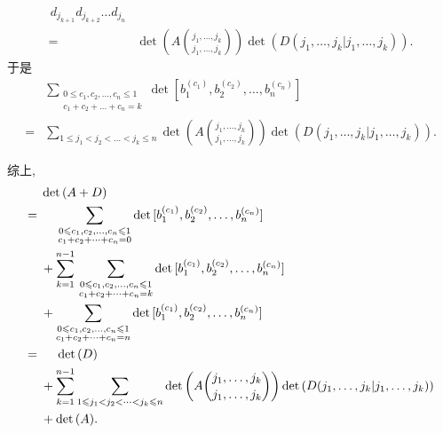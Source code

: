 \begin{example}
\begin{align*}
        \,
        d_{j_{k+1}} d_{j_{k+2}} \dots d_{j_n}
        \\
        = {} &
        \det {\left(
            A\binom{j_1,\dots,j_k}{j_1,\dots,j_k}
            \right)}
        \det {(D({j_1,\dots,j_k}|{j_1,\dots,j_k}))}.
    \end{align*}
    于是
    \begin{align*}
             &
        \sum_{\substack{0 \leq c_1, c_2, \dots, c_n \leq 1 \\
                c_1 + c_2 + \dots + c_n = k}}
        \det {[b_1^{(c_1)}, b_2^{(c_2)}, \dots, b_n^{(c_n)}]}
        \\
        = {} &
        \sum_{1 \leq j_1 < j_2 < \dots < j_k \leq n}
        \det {\left(
            A\binom{j_1,\dots,j_k}{j_1,\dots,j_k}
            \right)}
        \det {(D({j_1,\dots,j_k}|{j_1,\dots,j_k}))}.
    \end{align*}

    综上,
    \begin{align*}
             &
        \det {(A + D)}
        \\
        = {} &
        \hphantom{{} + {}}
        \sum_{\substack{0 \leq c_1, c_2, \dots, c_n \leq 1 \\
                c_1 + c_2 + \dots + c_n = 0}}
        \det {[b_1^{(c_1)}, b_2^{(c_2)}, \dots, b_n^{(c_n)}]}
        \\
             &
        +
        \sum_{k = 1}^{n-1}\,
        \sum_{\substack{0 \leq c_1, c_2, \dots, c_n \leq 1 \\
                c_1 + c_2 + \dots + c_n = k}}
        \det {[b_1^{(c_1)}, b_2^{(c_2)}, \dots, b_n^{(c_n)}]}
        \\
             &
        +
        \sum_{\substack{0 \leq c_1, c_2, \dots, c_n \leq 1 \\
                c_1 + c_2 + \dots + c_n = n}}
        \det {[b_1^{(c_1)}, b_2^{(c_2)}, \dots, b_n^{(c_n)}]}
        \\
        = {} &
        \hphantom{{} + {}}
        \det {(D)}
        \\
             &
        + \sum_{k = 1}^{n-1}
        {
        \sum_{1 \leq j_1 < j_2 < \dots < j_k \leq n}
        \det {\left(
            A\binom{j_1,\dots,j_k}{j_1,\dots,j_k}
            \right)}
        \det {(D({j_1,\dots,j_k}|{j_1,\dots,j_k}))}
        }
        \\
             &
        + \det {(A)}.
    \end{align*}
\end{example}

